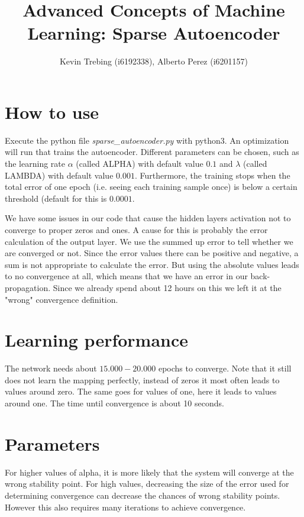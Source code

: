 \documentclass[a4paper]{article}
\title{Advanced Concepts of Machine Learning: Sparse Autoencoder}
\author{Kevin Trebing (i6192338), Alberto Perez (i6201157)}
\begin{document}
\maketitle

\section{How to use}
Execute the python file \textit{sparse\_autoencoder.py} with python3. An optimization will run that trains the autoencoder. Different parameters can be chosen, such as the learning rate $\alpha$ (called ALPHA) with default value $0.1$ and $\lambda$ (called LAMBDA) with default value $0.001$. Furthermore, the training stops when the total error of one epoch (i.e. seeing each training sample once) is below a certain threshold (default for this is $0.0001$.

We have some issues in our code that cause the hidden layers activation not to converge to proper zeros and ones. A cause for this is probably the error calculation of the output layer. We use the summed up error to tell whether we are converged or not. Since the error values there can be positive and negative, a sum is not appropriate to calculate the error. But using the absolute values leads to no convergence at all, which means that we have an error in our back-propagation. Since we already spend about 12 hours on this we left it at the "wrong" convergence definition.


\section{Learning performance}
The network needs about $15.000-20.000$ epochs to converge. Note that it still does not learn the mapping perfectly, instead of zeros it most often leads to values around zero. The same goes for values of one, here it leads to values around one. The time until convergence is about 10 seconds.

\section{Parameters}

For higher values of alpha, it is more likely that the system will converge at the wrong stability point. For high values, decreasing the size of the error used for determining convergence can decrease the chances of wrong stability points. However this also requires many iterations to achieve convergence.
\end{document}
